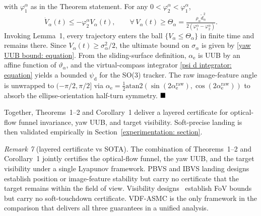 \documentclass{IEEEtaes}
\begin{document}
with $\varphi_1^\alpha$ as in the Theorem statement. For any $0<\varphi_2^\alpha<\varphi_1^\alpha$,
\begin{equation*}
\dot{V}_\alpha(t)\le -\varphi_2^\alpha V_\alpha(t),\qquad \forall\,V_\alpha(t)\ge\Theta_\alpha = \tfrac{\rho_\alpha\tilde{d}_\alpha^2}{2(\varphi_1^\alpha-\varphi_2^\alpha)}.
\end{equation*}
Invoking Lemma~1, every trajectory enters the ball $\{V_\alpha\le\Theta_\alpha\}$ in finite time and remains there. Since $V_\alpha(t)\ge\sigma_\alpha^2/2$, the ultimate bound on $\sigma_\alpha$ is given by \eqref{yaw UUB bound: equation}. From the sliding-surface definition, $\alpha_\text{e}$ is UUB by an affine function of $\vartheta_\alpha$, and the virtual-compass integrator \eqref{psi d integrator: equation} yields a bounded $\psi_\text{d}$ for the SO(3) tracker. The raw image-feature angle is unwrapped to $(-\pi/2,\pi/2]$ via $\alpha_\text{e} = \tfrac12\text{atan2}(\sin(2\alpha_\text{e}^\text{raw}),\cos(2\alpha_\text{e}^\text{raw}))$ to absorb the ellipse-orientation half-turn symmetry. $\hfill\blacksquare$

Together, Theorems~1--2 and Corollary~1 deliver a layered certificate for optical-flow funnel invariance, yaw UUB, and target visibility. Soft-precise landing is then validated empirically in Section~\ref{experimentation: section}.

\textit{Remark 7} (layered certificate vs SOTA). The combination of Theorems~1--2 and Corollary~1 jointly certifies the optical-flow funnel, the yaw UUB, and the target visibility under a single Lyapunov framework. PBVS and IBVS landing designs~\cite{lin2022, zhang2026, cho2022, lin2023} establish position or image-feature stability but carry no certificate that the target remains within the field of view. Visibility designs~\cite{salehi2021, xie2016} establish FoV bounds but carry no soft-touchdown certificate. VDF-ASMC is the only framework in the comparison that delivers all three guarantees in a unified analysis.
\end{document}
